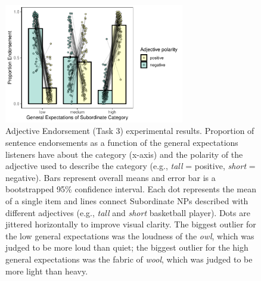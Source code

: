\documentclass[doc]{apa6}
\begin{document}
\begin{figure}[!t]
\centering
\includegraphics[width=0.7\textwidth]{figs/bars_adj_finalExpt_prereg_bars_syncDodge.pdf}
\caption{Adjective Endorsement (Task 3) experimental results. Proportion of sentence endorsements as a function of the general expectations listeners have about the category (x-axis) and the polarity of the adjective used to describe the category (e.g., \emph{tall} = positive, \emph{short} = negative). Bars represent overall means and error bar is a bootstrapped 95\% confidence interval. Each dot represents the mean of a single item and lines connect Subordinate NPs described with different adjectives (e.g., \emph{tall} and \emph{short} basketball player). Dots are jittered horizontally to improve visual clarity. The biggest outlier for the low general expectations was the loudness of the \emph{owl}, which was judged to be more loud than quiet; the biggest outlier for the high general expectations was the fabric of \emph{wool}, which was judged to be more light than heavy. }\label{fig:adjEndorseMain}
\end{figure}
\end{document}
